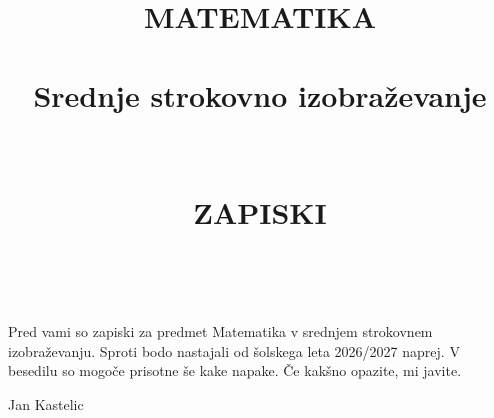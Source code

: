 \documentclass[11pt,a4paper]{book}
\author{}
\title{\Huge{MATEMATIKA \\ ~ \\ Srednje strokovno izobraževanje} \\~\\ ~\\\Large{ZAPISKI}}
\begin{document}
\frontmatter
\maketitle

\newpage
\thispagestyle{empty}
~

\newpage

\mbox{}
\vfill
Pred vami so zapiski za predmet Matematika v srednjem strokovnem izobraževanju. 
Sproti bodo nastajali od šolskega leta 2026/2027 naprej.
V besedilu so mogoče prisotne še kake napake. Če kakšno opazite, mi javite.
\bigskip
\begin{flushright}
  Jan Kastelic  \qquad \qquad\qquad\qquad\hbox{} \\
\end{flushright}

\newpage
\thispagestyle{empty}
~

\tableofcontents

\newpage
\thispagestyle{empty}
~

\mainmatter

% 













% 



% 

% 











\end{document}
